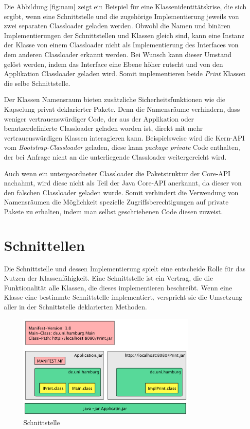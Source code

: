     Die Abbildung \ref{fig:nam} zeigt ein Beispiel für eine Klassenidentitätskrise, die sich ergibt, wenn eine Schnittstelle und die zugehörige Implementierung jeweils von zwei separaten Classloader geladen werden. Obwohl die Namen und binären Implementierungen der Schnittstellen und Klassen gleich sind, kann eine Instanz der Klasse von einem Classloader nicht als Implementierung des Interfaces von dem anderen Classloader erkannt werden. Bei Wunsch kann dieser Umstand gelöst werden, indem das Interface eine Ebene höher rutscht und von den Applikation Classloader geladen wird. Somit implementieren beide \textit{Print} Klassen die selbe Schnittstelle.\bigbreak 

    Der Klassen Namensraum bieten zusätzliche Sicherheitsfunktionen wie die Kapselung privat deklarierter Pakete. Denn die Namensräume verhindern, dass weniger vertrauenswürdiger Code, der aus der Applikation oder benutzerdefinierte Classloader geladen worden ist, direkt mit mehr vertrauenswürdigen Klassen interagieren kann. Beispielsweise wird die Kern-API vom \textit{Bootstrap-Classloader} geladen, diese kann \textit{package private} Code enthalten, der bei Anfrage nicht an die unterliegende Classloader weitergereicht wird.


    Auch wenn ein untergeordneter Classloader die Paketstruktur der Core-API nachahmt, wird diese nicht als Teil der Java Core-API anerkannt, da dieser von den falschen Classloader geladen wurde. Somit verhindert die Verwendung von Namensräumen die Möglichkeit spezielle Zugriffsberechtigungen auf private Pakete zu erhalten, indem man selbst geschriebenen Code diesen zuweist.


\section{Schnittellen} \label{sec:kap}
  
  Die Schnittstelle und dessen Implementierung spielt eine entscheide Rolle für das Nutzen der Klassenfähigkeit. Eine Schnittstelle ist ein Vertrag, die die Funktionalität alle Klassen, die dieses implementieren beschreibt. Wenn eine Klasse eine bestimmte Schnittstelle implementiert, verspricht sie die Umsetzung aller in der Schnittstelle deklarierten Methoden.

  \begin{figure}[h!]
    \centering
    \includegraphics[width=0.8\textwidth]{material/images/Interface.png}
    \caption{Schnittstelle}
    \label{fig:schnitt}
  \end{figure}

